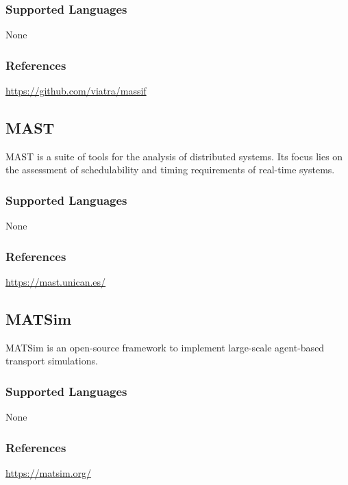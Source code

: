 \subsubsection{Supported Languages}

None


\subsubsection{References}

\url{https://github.com/viatra/massif}



\subsection{MAST}
\label{subsecT:MAST}

MAST is a suite of tools for the analysis of distributed systems.
Its focus lies on the assessment of schedulability and timing requirements of real-time systems.


\subsubsection{Supported Languages}

None


\subsubsection{References}

\url{https://mast.unican.es/}



\subsection{MATSim}
\label{subsecT:MATSim}

MATSim is an open-source framework to implement large-scale agent-based transport simulations.

\subsubsection{Supported Languages}

None


\subsubsection{References}

\url{https://matsim.org/}

